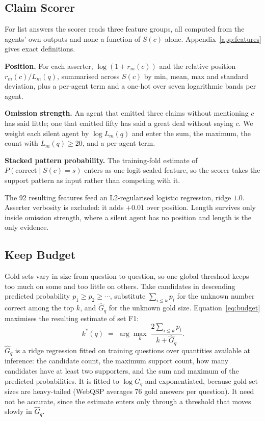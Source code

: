 \documentclass[11pt]{article}
\begin{document}
\subsection{Claim Scorer}
\label{sec:slotA}

For list answers the scorer reads three feature groups, all computed from the agents'
own outputs and none a function of $S(c)$ alone. Appendix~\ref{app:features} gives exact
definitions.

\textbf{Position.} For each asserter, $\log(1 + r_m(c))$ and the relative position
$r_m(c)/L_m(q)$, summarised across $S(c)$ by min, mean, max and standard deviation, plus
a per-agent term and a one-hot over seven logarithmic bands per agent.

\textbf{Omission strength.} An agent that emitted three claims without mentioning $c$ has
said little; one that emitted fifty has said a great deal without saying $c$. We weight
each silent agent by $\log L_m(q)$ and enter the sum, the maximum, the count with
$L_m(q) \geq 20$, and a per-agent term.

\textbf{Stacked pattern probability.} The training-fold estimate of
$P(\mathrm{correct} \mid S(c) = s)$ enters as one logit-scaled feature, so the scorer
takes the support pattern as input rather than competing with it.

The 92 resulting features feed an L2-regularised logistic regression, ridge $1.0$.
Asserter verbosity is excluded: it adds $+0.01$ over position. Length survives only
inside omission strength, where a silent agent has no position and length is the only
evidence.

\subsection{Keep Budget}
\label{sec:slotB}

Gold sets vary in size from question to question, so one global threshold keeps too much
on some and too little on others. Take candidates in descending predicted probability
$p_1 \geq p_2 \geq \cdots$, substitute $\sum_{i \leq k} p_i$ for the unknown number
correct among the top $k$, and $\hat{G}_q$ for the unknown gold size.
Equation~\ref{eq:budget} maximises the resulting estimate of set F1:
\begin{equation}
\label{eq:budget}
  k^*(q) \;=\; \arg\max_k \; \frac{2 \sum_{i \leq k} p_i}{k + \hat{G}_q}.
\end{equation}
$\hat{G}_q$ is a ridge regression fitted on training questions over quantities available
at inference: the candidate count, the maximum support count, how many candidates have
at least two supporters, and the sum and maximum of the predicted probabilities. It is fitted to $\log G_q$ and exponentiated, because gold-set sizes are heavy-tailed (WebQSP averages 76 gold answers per question). It need
not be accurate, since the estimate enters only through a threshold that moves slowly in
$\hat{G}_q$.
\end{document}
